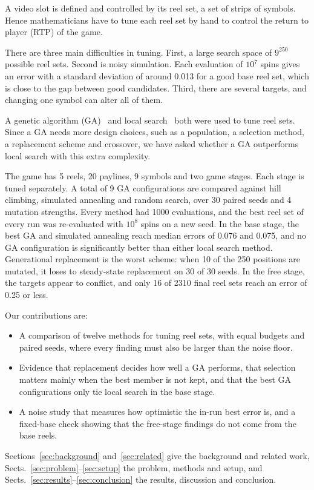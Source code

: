
A video slot is defined and controlled by its reel set, a set of strips of symbols. Hence mathematicians have to tune each reel set by hand to control the return to player (RTP) of the game.

There are three main difficulties in tuning. First, a large search space of $9^{250}$ possible reel sets. Second is noisy simulation. Each evaluation of $10^7$ spins gives an error with a standard deviation of around 0.013 for a good base reel set, which is close to the gap between good candidates. Third, there are several targets, and changing one symbol can alter all of them.

A genetic algorithm (GA)~\cite{balabanov2015slot} and local search~\cite{kamanas2021slot} both were used to tune reel sets. Since a GA needs more design choices, such as a population, a selection method, a replacement scheme and crossover, we have asked whether a GA outperforms local search with this extra complexity.

The game has 5 reels, 20 paylines, 9 symbols and two game stages. Each stage is tuned separately. A total of 9 GA configurations are compared against hill climbing, simulated annealing and random search, over 30 paired seeds and 4 mutation strengths. Every method had 1000 evaluations, and the best reel set of every run was re-evaluated with $10^8$ spins on a new seed. In the base stage, the best GA and simulated annealing reach median errors of 0.076 and 0.075, and no GA configuration is significantly better than either local search method. Generational replacement is the worst scheme: when 10 of the 250 positions are mutated, it loses to steady-state replacement on 30 of 30 seeds. In the free stage, the targets appear to conflict, and only 16 of 2310 final reel sets reach an error of 0.25 or less.

Our contributions are:
\begin{itemize}
\item A comparison of twelve methods for tuning reel sets, with equal budgets and paired seeds, where every finding must also be larger than the noise floor.
\item Evidence that replacement decides how well a GA performs, that selection matters mainly when the best member is not kept, and that the best GA configurations only tie local search in the base stage.
\item A noise study that measures how optimistic the in-run best error is, and a fixed-base check showing that the free-stage findings do not come from the base reels.
\end{itemize}

Sections~\ref{sec:background} and~\ref{sec:related} give the background and related work, Sects.~\ref{sec:problem}--\ref{sec:setup} the problem, methods and setup, and Sects.~\ref{sec:results}--\ref{sec:conclusion} the results, discussion and conclusion.
